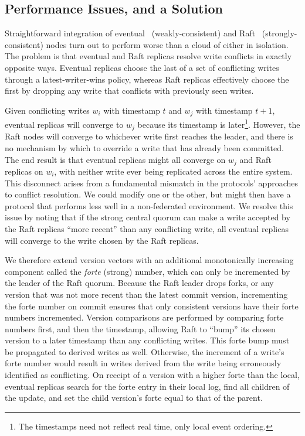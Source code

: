 \documentclass[conference,letterpaper]{IEEEtran}
\begin{document}
\subsection{Performance Issues, and a Solution}

Straightforward integration of eventual~\cite{terry_session_1994} (weakly-consistent) and
Raft~\cite{ongaro_search_2014} (strongly-consistent) nodes turn out to
perform worse than a  cloud of either in isolation.
The problem is that eventual and Raft replicas resolve write conflicts in
exactly opposite ways.
Eventual replicas choose the last of a set of conflicting writes through a
latest-writer-wins policy, whereas Raft replicas effectively choose the first
by dropping any write that conflicts with previously seen writes.

Given conflicting writes $w_i$ with timestamp $t$ and $w_j$ with timestamp
$t+1$, eventual replicas will converge to $w_j$ because its timestamp is
later\footnote{The timestamps need not reflect real time, only local event ordering.}.
However, the Raft nodes will converge to whichever write first reaches the
leader, and there is no mechanism by which to override a write that has already
been committed.
The end result is that eventual replicas might all converge on $w_j$ and
Raft replicas on $w_i$, with neither write ever being replicated across
the entire system.
This disconnect arises from a fundamental mismatch in the protocols'
approaches to conflict resolution.
We could modify one or the other, but might then have a protocol that performs
less well in a non-federated environment.
We resolve this issue by noting that if the strong central quorum can make a
write accepted by the Raft replicas ``more recent'' than any conflicting
write, all eventual replicas will converge to the write chosen by the Raft
replicas.

We therefore extend version vectors with an additional monotonically
increasing component called the \textit{forte} (strong) number, which can only
be incremented by the leader of the Raft quorum.
Because the Raft leader drops forks, or any version that was not more recent
than the latest commit version, incrementing the forte number on commit
ensures that only consistent versions have their forte numbers incremented.
Version comparisons are performed by comparing forte
numbers first, and then the timestamp, allowing Raft to ``bump'' its chosen
version to a later timestamp than any conflicting writes.
This forte bump must be propagated to derived writes as well.
Otherwise, the increment of a write's forte number would result in writes
derived from the write being erroneously identified as conflicting.
On receipt of a version with a higher forte than the local, eventual replicas
search for the forte entry in their local log, find all children of the
update, and set the child version's forte equal to that of the parent.
\end{document}

